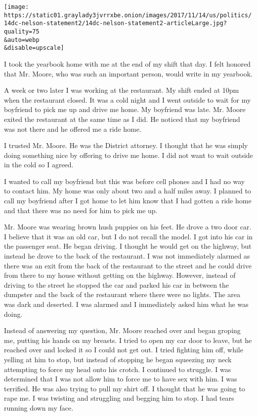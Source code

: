 \texttt{[image: https://static01.graylady3jvrrxbe.onion/images/2017/11/14/us/politics/14dc-nelson-statement2/14dc-nelson-statement2-articleLarge.jpg?quality=75\\\&auto=webp\\\&disable=upscale]}

I took the yearbook home with me at the end of my shift that day. I felt
honored that Mr. Moore, who was such an important person, would write in
my yearbook.

A week or two later I was working at the restaurant. My shift ended at
10pm when the restaurant closed. It was a cold night and I went outside
to wait for my boyfriend to pick me up and drive me home. My boyfriend
was late. Mr. Moore exited the restaurant at the same time as I did. He
noticed that my boyfriend was not there and he offered me a ride home.

I trusted Mr. Moore. He was the District attorney. I thought that he was
simply doing something nice by offering to drive me home. I did not want
to wait outside in the cold so I agreed.

I wanted to call my boyfriend but this was before cell phones and I had
no way to contact him. My home was only about two and a half miles away.
I planned to call my boyfriend after I got home to let him know that I
had gotten a ride home and that there was no need for him to pick me up.

Mr. Moore was wearing brown hush puppies on his feet. He drove a two
door car. I believe that it was an old car, but I do not recall the
model. I got into his car in the passenger seat. He began driving. I
thought he would get on the highway, but instead he drove to the back of
the restaurant. I was not immediately alarmed as there was an exit from
the back of the restaurant to the street and he could drive from there
to my house without getting on the highway. However, instead of driving
to the street he stopped the car and parked his car in between the
dumpster and the back of the restaurant where there were no lights. The
area was dark and deserted. I was alarmed and I immediately asked him
what he was doing.

Instead of answering my question, Mr. Moore reached over and began
groping me, putting his hands on my breasts. I tried to open my car door
to leave, but he reached over and locked it so I could not get out. I
tried fighting him off, while yelling at him to stop, but instead of
stopping he began squeezing my neck attempting to force my head onto his
crotch. I continued to struggle. I was determined that I was not allow
him to force me to have sex with him. I was terrified. He was also
trying to pull my shirt off. I thought that he was going to rape me. I
was twisting and struggling and begging him to stop. I had tears running
down my face.

